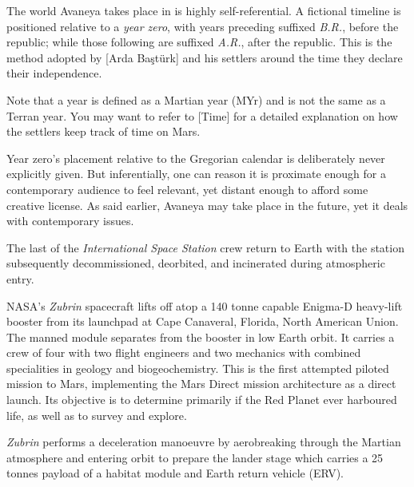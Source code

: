 
\startlines

The world Avaneya takes place in is highly self-referential. A fictional timeline is positioned relative to a {\it year zero}, with years preceding suffixed {\it B.R.}, before the republic; while those following are suffixed {\it A.R.}, after the republic. This is the method adopted by [Arda Baştürk] and his settlers around the time they declare their independence.

Note that a year is defined as a Martian year (MYr) and is not the same as a Terran year. You may want to refer to [Time] for a detailed explanation on how the settlers keep track of time on Mars.

Year zero's placement relative to the Gregorian calendar is deliberately never explicitly given. But inferentially, one can reason it is proximate enough for a contemporary audience to feel relevant, yet distant enough to afford some creative license. As said earlier, Avaneya may take place in the future, yet it deals with contemporary issues.
\crlf

The last of the {\it International Space Station} crew return to Earth with the station subsequently decommissioned, deorbited, and incinerated during atmospheric entry.
\StopTimelineDate

NASA's {\it Zubrin} spacecraft lifts off atop a 140 tonne capable Enigma-D heavy-lift booster from its launchpad at Cape Canaveral, Florida, North American Union. The manned module separates from the booster in low Earth orbit. It carries a crew of four with two flight engineers and two mechanics with combined specialities in geology and biogeochemistry. This is the first attempted piloted mission to Mars, implementing the Mars Direct mission architecture as a direct launch. Its objective is to determine primarily if the Red Planet ever harboured life, as well as to survey and explore.
\StopTimelineDate

{\it Zubrin} performs a deceleration manoeuvre by aerobreaking through the Martian atmosphere and entering orbit to prepare the lander stage which carries a 25 tonnes payload of a habitat module and Earth return vehicle (ERV).
\StopTimelineDate


